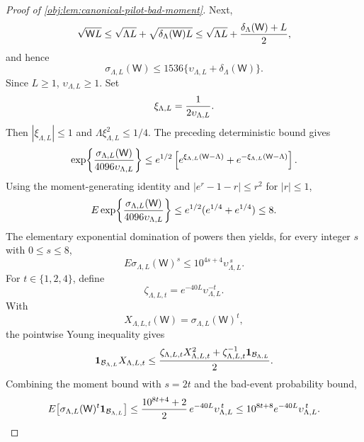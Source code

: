 \documentclass[11pt]{article}
\begin{document}
\begin{proof}[Proof of \cref{obj:lem:canonical-pilot-bad-moment}]
Next,
\[
\sqrt{\mathsf W L}
\le
\sqrt{\Lambda L}+\sqrt{\delta_{\Lambda}(\mathsf W)L}
\le
\sqrt{\Lambda L}+{\delta_{\Lambda}(\mathsf W)+L\over2},
\]
and hence
\[
\sigma_{\Lambda,L}(\mathsf W)
\le
1536\{\upsilon_{\Lambda,L}+\delta_{\Lambda}(\mathsf W)\}.
\]
Since \(L\ge1\), \(\upsilon_{\Lambda,L}\ge1\).  Set
\[
\xi_{\Lambda,L}={1\over 2\upsilon_{\Lambda,L}}.
\]
Then \(|\xi_{\Lambda,L}|\le1\) and
\(\Lambda\xi_{\Lambda,L}^2\le1/4\).  The preceding deterministic bound gives
\[
\exp\!\left\{
{\sigma_{\Lambda,L}(\mathsf W)\over4096\upsilon_{\Lambda,L}}
\right\}
\le
e^{1/2}
\left[
e^{\xi_{\Lambda,L}(\mathsf W-\Lambda)}
+
e^{-\xi_{\Lambda,L}(\mathsf W-\Lambda)}
\right].
\]
Using the moment-generating identity and
\(|e^r-1-r|\le r^2\) for \(|r|\le1\),
\[
E\exp\!\left\{
{\sigma_{\Lambda,L}(\mathsf W)\over4096\upsilon_{\Lambda,L}}
\right\}
\le
e^{1/2}(e^{1/4}+e^{1/4})
\le 8.
\]
The elementary exponential domination of powers then yields, for every integer
\(s\) with \(0\le s\le8\),
\[
E\sigma_{\Lambda,L}(\mathsf W)^s
\le
10^{4s+4}\upsilon_{\Lambda,L}^{\,s}.
\]
For \(t\in\{1,2,4\}\), define
\[
\zeta_{\Lambda,L,t}
=
e^{-40L}\upsilon_{\Lambda,L}^{-t}.
\]
With
\[
X_{\Lambda,L,t}(\mathsf W)=\sigma_{\Lambda,L}(\mathsf W)^t,
\]
the pointwise Young inequality gives
\[
\mathbf 1_{\mathcal B_{\Lambda,L}}X_{\Lambda,L,t}
\le
{ \zeta_{\Lambda,L,t}X_{\Lambda,L,t}^2
+\zeta_{\Lambda,L,t}^{-1}\mathbf 1_{\mathcal B_{\Lambda,L}}
\over2}.
\]
Combining the moment bound with \(s=2t\) and the bad-event probability bound,
\[
E\!\left[
\sigma_{\Lambda,L}(\mathsf W)^t\mathbf 1_{\mathcal B_{\Lambda,L}}
\right]
\le
{10^{8t+4}+2\over2}\,
e^{-40L}\upsilon_{\Lambda,L}^{\,t}
\le
10^{8t+8}e^{-40L}\upsilon_{\Lambda,L}^{\,t}.
\]


\end{proof}
\end{document}
